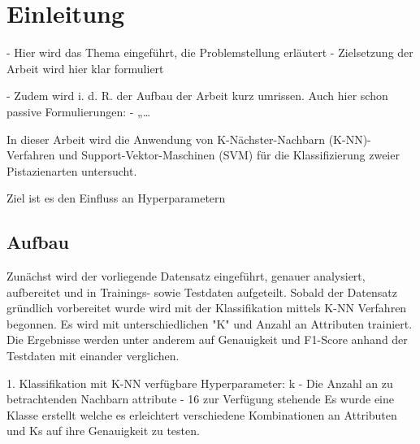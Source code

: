 
\section{Einleitung}

- Hier wird das Thema eingeführt, die Problemstellung erläutert 
- Zielsetzung der Arbeit wird hier klar formuliert

- Zudem wird i. d. R. der Aufbau der Arbeit kurz umrissen.
Auch hier schon passive Formulierungen:
- „…


In dieser Arbeit wird die Anwendung von K-Nächster-Nachbarn (K-NN)-Verfahren und Support-Vektor-Maschinen (SVM) für die Klassifizierung zweier Pistazienarten untersucht. 

Ziel ist es den Einfluss an Hyperparametern 

\subsection{Aufbau}
Zunächst wird der vorliegende Datensatz eingeführt, genauer analysiert, aufbereitet und in Trainings- sowie Testdaten aufgeteilt.
Sobald der Datensatz gründlich vorbereitet wurde wird mit der Klassifikation mittels K-NN Verfahren begonnen. 
Es wird mit unterschiedlichen "K" und Anzahl an Attributen trainiert. 
Die Ergebnisse werden unter anderem auf Genauigkeit und F1-Score anhand der Testdaten mit einander verglichen.

1. Klassifikation mit K-NN
verfügbare Hyperparameter:
 k - Die Anzahl an zu betrachtenden Nachbarn
 attribute - 16 zur Verfügung stehende
Es wurde eine Klasse erstellt welche es erleichtert verschiedene Kombinationen an Attributen und Ks auf ihre Genauigkeit zu testen. 
